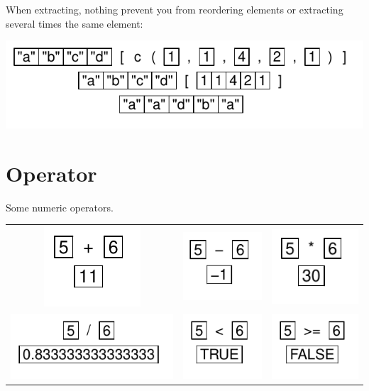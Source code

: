 \documentclass[pdflatex]{article}
\begin{document}
When extracting, nothing prevent you from reordering elements or extracting  several times the same element:

\includegraphics{extract_repeating}

\section{Operator}

Some numeric operators.

\begin{tabular}{ccc}
\includegraphics{operator_plus} & \includegraphics{operator_minus} & \includegraphics{operator_time}\\
\includegraphics{operator_div} & \includegraphics{operator_strict_lt} & \includegraphics{operator_gt_or_equal}\\
\end{tabular}
\end{document}
